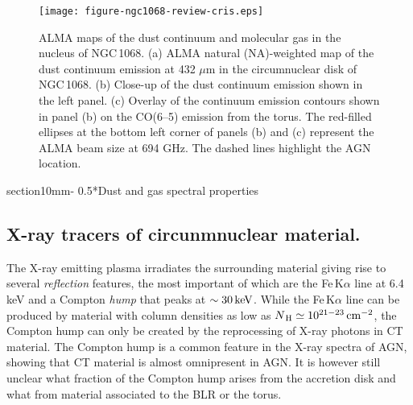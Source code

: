 \documentclass{natureprintstyle}
\makeatletter
\renewcommand{\section}{\@startsection%
{section}{1}{0mm}{-\baselineskip}%
{0.5\baselineskip}{\normalfont\Large\bfseries}}%
\makeatother
\begin{document}
\begin{figure*}
\centering
\texttt{[image: figure-ngc1068-review-cris.eps]}
\caption{{ALMA maps of the dust continuum and molecular gas in the nucleus of NGC\,1068\cite{Garcia16}.} (a) ALMA natural (NA)-weighted map of the dust continuum emission at 
432 $\mu$m in the circumnuclear disk of NGC\,1068. (b) Close-up of the dust continuum emission shown in the left panel. (c) Overlay of the continuum emission contours shown 
in panel (b) on the CO(6--5) emission from the torus. The red-filled ellipses at the bottom left corner of panels (b) and (c) represent the ALMA beam size at 694 GHz. The dashed
lines highlight the AGN location.}
\label{alma}
\end{figure*}

\section*{Dust and gas spectral properties}


\subsection*{X-ray tracers of circunmnuclear material.}

The X-ray emitting plasma irradiates the surrounding material giving rise to several {\it reflection} features, the most important of which are the Fe\,K$\alpha$ line at 6.4\,keV and a 
Compton {\it hump} that peaks at $\sim 30\rm\,keV$\cite{Matt:1991ly}. While the Fe\,K$\alpha$ line can be produced by material with column densities as low as 
$N_{\rm\,H}\simeq 10^{21-23}\rm\,cm^{-2}$, the Compton hump can only be created by the reprocessing of X-ray photons in CT material. The Compton hump is a common feature in the X-ray spectra of AGN, showing that CT material is almost omnipresent in AGN. It is however still unclear what fraction of the Compton hump arises {from the accretion disk and what from material associated to the BLR or the torus.}
\end{document}
